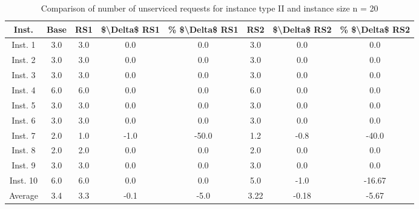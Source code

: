 \begin{table}[H]
\centering
\begin{tabular}{cccccccc}
  \hline
  \textbf{Inst.} & \textbf{Base} & \textbf{RS1} & \textbf{\$\textbackslash{}Delta\$  RS1} & \textbf{\% \$\textbackslash{}Delta\$  RS1} & \textbf{RS2} & \textbf{\$\textbackslash{}Delta\$  RS2} & \textbf{\% \$\textbackslash{}Delta\$  RS2} \\\hline
  Inst. 1 & 3.0 & 3.0 & 0.0 & 0.0 & 3.0 & 0.0 & 0.0 \\
  Inst. 2 & 3.0 & 3.0 & 0.0 & 0.0 & 3.0 & 0.0 & 0.0 \\
  Inst. 3 & 3.0 & 3.0 & 0.0 & 0.0 & 3.0 & 0.0 & 0.0 \\
  Inst. 4 & 6.0 & 6.0 & 0.0 & 0.0 & 6.0 & 0.0 & 0.0 \\
  Inst. 5 & 3.0 & 3.0 & 0.0 & 0.0 & 3.0 & 0.0 & 0.0 \\
  Inst. 6 & 3.0 & 3.0 & 0.0 & 0.0 & 3.0 & 0.0 & 0.0 \\
  Inst. 7 & 2.0 & 1.0 & -1.0 & -50.0 & 1.2 & -0.8 & -40.0 \\
  Inst. 8 & 2.0 & 2.0 & 0.0 & 0.0 & 2.0 & 0.0 & 0.0 \\
  Inst. 9 & 3.0 & 3.0 & 0.0 & 0.0 & 3.0 & 0.0 & 0.0 \\
  Inst. 10 & 6.0 & 6.0 & 0.0 & 0.0 & 5.0 & -1.0 & -16.67 \\
  Average & 3.4 & 3.3 & -0.1 & -5.0 & 3.22 & -0.18 & -5.67 \\\hline
\end{tabular}
\caption{Comparison of number of unserviced requests for instance type II and instance size n = 20}
\label{tab:wait:resrelocation-nTaxi-comparison_II_20}
\end{table}
